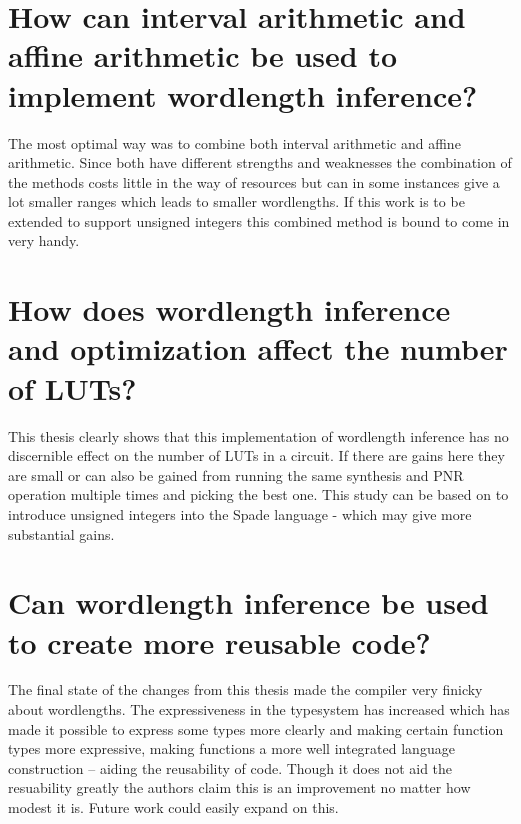 \section{How can interval arithmetic and affine arithmetic be used to implement wordlength inference?}
The most optimal way was to combine both interval arithmetic and affine arithmetic. Since both have different strengths and weaknesses the combination of the methods costs little in the way of resources but can in some instances give a lot smaller ranges which leads to smaller wordlengths. If this work is to be extended to support unsigned integers this combined method is bound to come in very handy. 

\section{How does wordlength inference and optimization affect the number of LUTs?}
This thesis clearly shows that this implementation of wordlength inference has no discernible effect on the number of LUTs in a circuit. If there are gains here they are small or can also be gained from running the same synthesis and PNR operation multiple times and picking the best one. This study can be based on to introduce unsigned integers into the Spade language - which may give more substantial gains.

\section{Can wordlength inference be used to create more reusable code?}
The final state of the changes from this thesis made the compiler very finicky about wordlengths. The expressiveness in the typesystem has increased which has made it possible to express some types more clearly and making certain function types more expressive, making functions a more well integrated language construction -- aiding the reusability of code. Though it does not aid the resuability greatly the authors claim this is an improvement no matter how modest it is. Future work could easily expand on this.

